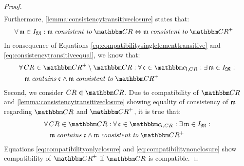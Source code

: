 \begin{proof}
\begin{align}
    \end{align}  
    Furthermore, \autoref{lemma:consistencytransitiveclosure} states that:
    \begin{align}
        & \label{eq:consistencytransitiveequal}
        \forall \modeltuple{m} \in \metamodeltupleinstanceset{M}: \modeltuple{m} \consistenttomath \consistencyrelationset{CR} \equivalent \modeltuple{m} \consistenttomath \transitiveclosure{\consistencyrelationset{CR}}
    \end{align}
    In consequence of Equations \ref{eq:compatibilitysinglelementtransitive} and \ref{eq:consistencytransitiveequal}, we know that:
    \begin{align}
        & \nonumber \label{eq:compatibilityonlyclosure}
        \forall \consistencyrelation{CR}{} \in \transitiveclosure{\consistencyrelationset{CR}} \setminus \consistencyrelationset{CR} : \forall \conditionelement{c}{} \in \condition{c}{l, \consistencyrelation{CR}{}} %
        : \exists \modeltuple{m} \in \metamodeltupleinstanceset{M} : \\
        & \formulaskip
        \modeltuple{m} \containsmath \conditionelement{c}{} \land \modeltuple{m} \consistenttomath \transitiveclosure{\consistencyrelationset{CR}}
    \end{align}
    Second, we consider $\consistencyrelation{CR}{} \in \consistencyrelationset{CR}$.
    Due to compatibility of $\consistencyrelationset{CR}$ and \autoref{lemma:consistencytransitiveclosure} showing equality of consistency of $\modeltuple{m}$ regarding $\consistencyrelationset{CR}$ and $\transitiveclosure{\consistencyrelationset{CR}}$, it is true that:
    \begin{align}
        & \nonumber \label{eq:compatibilitynonclosure}
        \forall \consistencyrelation{CR}{} \in \consistencyrelationset{CR} : \forall \conditionelement{c}{} \in \condition{c}{l, \consistencyrelation{CR}{}} %
        : \exists \modeltuple{m} \in \metamodeltupleinstanceset{M} : \\
        & \formulaskip
        \modeltuple{m} \containsmath \conditionelement{c}{} \land \modeltuple{m} \consistenttomath \transitiveclosure{\consistencyrelationset{CR}}
    \end{align}
    Equations \ref{eq:compatibilityonlyclosure} and \ref{eq:compatibilitynonclosure} show compatibility of $\transitiveclosure{\consistencyrelationset{CR}}$ if $\consistencyrelationset{CR}$ is compatible.
\end{proof}

